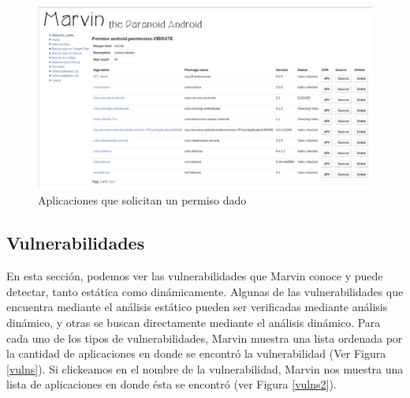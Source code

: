 \documentclass[11pt]{article}
\begin{document}
\begin{figure}[H]
\begin{center}
\includegraphics[width=\textwidth]{graphics/marvin_permissions2.png}
\caption{Aplicaciones que solicitan un permiso dado} \label{appsbyperm}
\end{center}
\end{figure}

\subsection{Vulnerabilidades}
En esta sección, podemos ver las vulnerabilidades que Marvin conoce y puede detectar, tanto estática como dinámicamente. Algunas de las vulnerabilidades que encuentra mediante el análisis estático pueden ser verificadas mediante análisis dinámico, y otras se buscan directamente mediante el análisis dinámico. Para cada uno de los tipos de vulnerabilidades, Marvin muestra una lista ordenada por la cantidad de aplicaciones en donde se encontró la vulnerabilidad (Ver Figura \ref{vulns}). Si clickeamos en el nombre de la vulnerabilidad, Marvin nos muestra una lista de aplicaciones en donde ésta se encontró (ver Figura \ref{vulns2}).
\end{document}
